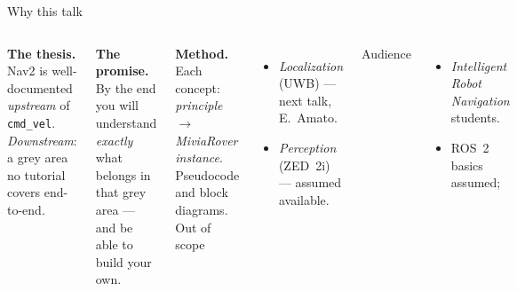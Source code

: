 \begin{frame}{Why this talk}
  \begin{columns}[T,onlytextwidth]
    \textbf{The thesis.}\;
Nav2 is well-documented \emph{upstream} of \texttt{cmd\_vel}.
    \emph{Downstream}: a \alert{grey area} no tutorial covers end-to-end.
\vspace{0.7em}

    \textbf{The promise.}\;
    By the end you will understand \emph{exactly} what belongs in that grey area — and be able to build your own.

\vspace{0.7em}
      \textbf{Method.}\;
      Each concept: \emph{principle} $\rightarrow$
      \emph{MiviaRover instance}. Pseudocode and block diagrams.
      \footnotesize
      \textcolor{black!60}{Out of scope}
      \begin{itemize}\setlength\itemsep{3pt}
        \item \emph{Localization} (UWB) — next talk, E.~Amato.
        \item \emph{Perception} (ZED~2i) — assumed available.
      \end{itemize}
      \vspace{0.6em}
      \textcolor{black!60}{Audience}
      \begin{itemize}\setlength\itemsep{3pt}
        \item \emph{Intelligent Robot Navigation} students.
        \item ROS~2 basics assumed;
      \end{itemize}
  \end{columns}
\end{frame}